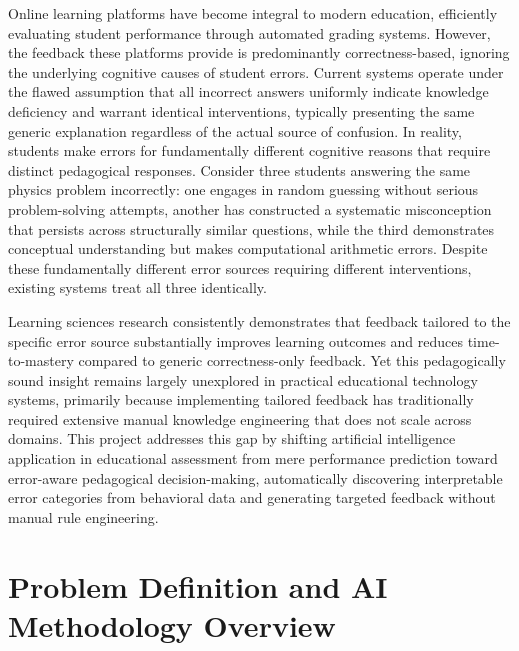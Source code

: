 \documentclass[conference]{IEEEtran}
\begin{document}
Online learning platforms have become integral to modern education, efficiently evaluating student performance through automated grading systems. However, the feedback these platforms provide is predominantly correctness-based, ignoring the underlying cognitive causes of student errors. Current systems operate under the flawed assumption that all incorrect answers uniformly indicate knowledge deficiency and warrant identical interventions, typically presenting the same generic explanation regardless of the actual source of confusion. In reality, students make errors for fundamentally different cognitive reasons that require distinct pedagogical responses. Consider three students answering the same physics problem incorrectly: one engages in random guessing without serious problem-solving attempts, another has constructed a systematic misconception that persists across structurally similar questions, while the third demonstrates conceptual understanding but makes computational arithmetic errors. Despite these fundamentally different error sources requiring different interventions, existing systems treat all three identically.

Learning sciences research consistently demonstrates that feedback tailored to the specific error source substantially improves learning outcomes and reduces time-to-mastery compared to generic correctness-only feedback. Yet this pedagogically sound insight remains largely unexplored in practical educational technology systems, primarily because implementing tailored feedback has traditionally required extensive manual knowledge engineering that does not scale across domains. This project addresses this gap by shifting artificial intelligence application in educational assessment from mere performance prediction toward error-aware pedagogical decision-making, automatically discovering interpretable error categories from behavioral data and generating targeted feedback without manual rule engineering.

\section{Problem Definition and AI Methodology Overview}
\end{document}
